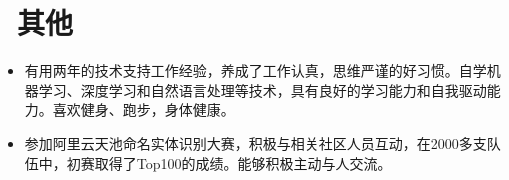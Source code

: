 \documentclass{resume}
\begin{document}



\section{\faInfo\ 其他}\normalsize
\begin{itemize}
\item {有用两年的技术支持工作经验，养成了工作认真，思维严谨的好习惯。自学机器学习、深度学习和自然语言处理等技术，具有良好的学习能力和自我驱动能力。喜欢健身、跑步，身体健康。}
\item{参加阿里云天池命名实体识别大赛，积极与相关社区人员互动，在2000多支队伍中，初赛取得了Top100的成绩。能够积极主动与人交流。}
\end{itemize}

%
%
\end{document}
